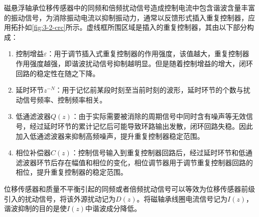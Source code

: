 磁悬浮轴承位移传感器中的同频和倍频扰动信号造成控制电流中包含谐波含量丰富的振动信号，为消除振动电流以抑制振动力，通常以反馈形式插入重复控制器，应用拓扑如\autoref{fig:3-2-crc}所示。虚线框所围区域是插入的重复控制器，其由以下部分构成：
\begin{enumerate}
	\item 控制增益$\varepsilon $：用于调节插入式重复控制器的作用强度，该值越大，重复控制器作用强度越强，即谐波扰动信号抑制越明显。但是随着控制增益的增大，闭环回路的稳定性在随之下降。
	\item 延时环节${z^{ - N}}$：用于记忆前某段时刻至当前时刻的波形，延时环节的个数与扰动信号频率、控制频率相关。
	\item 低通滤波器$Q(z)$：由于实际需要被消除的周期信号中同时含有噪声等无效信号，经过延时环节的累计记忆后可能导致环路输出发散，闭环回路失稳。因此加入低通滤波器来抑制高频噪声，提升重复控制器稳定范围。
	\item 相位补偿器$C(z)$：控制信号输入到重复控制器回路后，经过延时环节和低通滤波器环节后存在幅值和相位的变化，相位调节器用于调节重复控制器回路的相位，提升重复控制器的稳定范围。
\end{enumerate}

位移传感器和质量不平衡引起的同频或者倍频扰动信号可以等效为位移传感器前级引入的扰动信号，将该外源扰动记为$D(z)$。将磁轴承线圈电流信号记为$I(z)$，谐波抑制的目的是使$I(z)$中谐波成分降低。

